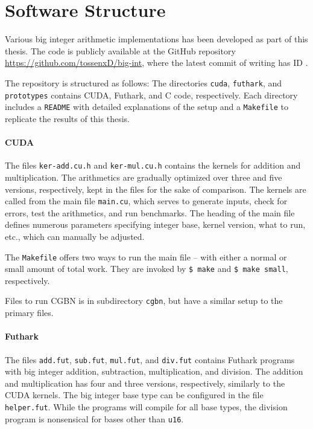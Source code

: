 \section{Software Structure}
\label{sec:software}

Various big integer arithmetic implementations has been developed as part of
this thesis. The code is publicly available at the GitHub repository
\url{https://github.com/tossenxD/big-int}, where the latest commit of writing
has ID {}.

The repository is structured as follows: The directories \texttt{cuda},
\texttt{futhark}, and \texttt{prototypes} contains CUDA, Futhark, and C code,
respectively. Each directory includes a \texttt{README} with detailed
explanations of the setup and a \texttt{Makefile} to replicate the results of
this thesis.

\paragraph{CUDA \cpp}
The files \texttt{ker-add.cu.h} and \texttt{ker-mul.cu.h} contains the kernels
for addition and multiplication. The arithmetics are gradually optimized over
three and five versions, respectively, kept in the files for the sake of
comparison. The kernels are called from the main file \texttt{main.cu}, which
serves to generate inputs, check for errors, test the arithmetics, and run
benchmarks. The heading of the main file defines numerous parameters specifying
integer base, kernel version, what to run, etc., which can manually be adjusted.

The \texttt{Makefile} offers two ways to run the main file -- with either a
normal or small amount of total work. They are invoked by \texttt{\$ make} and
\texttt{\$ make small}, respectively.

Files to run CGBN is in subdirectory \texttt{cgbn}, but have a similar setup to
the primary files.

\paragraph{Futhark}
The files \texttt{add.fut}, \texttt{sub.fut}, \texttt{mul.fut}, and
\texttt{div.fut} contains Futhark programs with big integer addition,
subtraction, multiplication, and division. The addition and multiplication has four
and three versions, respectively, similarly to the CUDA kernels. The big integer
base type can be configured in the file \texttt{helper.fut}. While the programs
will compile for all base types, the division program is nonsensical for bases
other than \texttt{u16}.

